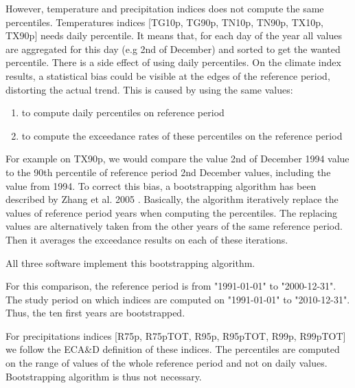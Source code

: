\documentclass[a4paper,11pt]{article}
\begin{document}
        However, temperature and precipitation indices does not compute the same percentiles.
        Temperatures indices [TG10p, TG90p, TN10p, TN90p, TX10p, TX90p] needs daily percentile. It means that, for each day of the year all values are aggregated for this day (e.g 2nd of December) and sorted to get the wanted percentile. 
        There is a side effect of using daily percentiles. On the climate index results, a statistical bias could be visible at the edges of the reference period, distorting the actual trend.
        This is caused by using the same values:
        \begin{enumerate}
            \item to compute daily percentiles on reference period
            \item to compute the exceedance rates of these percentiles on the reference period
        \end{enumerate}
        For example on TX90p, we would compare the value 2nd of December 1994 value to the 90th percentile of reference period 2nd December values, including the value from 1994.
        To correct this bias, a bootstrapping algorithm has been described by Zhang et al. 2005 \cite{quote/zhang_et_al}.
        Basically, the algorithm iteratively replace the values of reference period years when computing the percentiles.
        The replacing values are alternatively taken from the other years of the same reference period.
        Then it averages the exceedance results on each of these iterations.

        All three software implement this bootstrapping algorithm.

        For this comparison, the reference period is from "1991-01-01" to "2000-12-31".
        The study period on which indices are computed on "1991-01-01" to "2010-12-31".
        Thus, the ten first years are bootstrapped.

        For precipitations indices [R75p, R75pTOT, R95p, R95pTOT, R99p, R99pTOT] we follow the ECA\&D definition of these indices.
        The percentiles are computed on the range of values of the whole reference period and not on daily values.
        Bootstrapping algorithm is thus not necessary.
\end{document}
